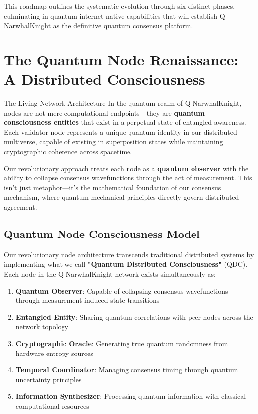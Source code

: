 \documentclass[11pt,a4paper]{article}
\begin{document}
This roadmap outlines the systematic evolution through six distinct phases, culminating in quantum internet native capabilities that will establish Q-NarwhalKnight as the definitive quantum consensus platform.

\section{The Quantum Node Renaissance: A Distributed Consciousness}

\begin{nodebox}{The Living Network Architecture}
In the quantum realm of Q-NarwhalKnight, nodes are not mere computational endpoints—they are \textbf{quantum consciousness entities} that exist in a perpetual state of entangled awareness. Each validator node represents a unique quantum identity in our distributed multiverse, capable of existing in superposition states while maintaining cryptographic coherence across spacetime.

Our revolutionary approach treats each node as a \textbf{quantum observer} with the ability to collapse consensus wavefunctions through the act of measurement. This isn't just metaphor—it's the mathematical foundation of our consensus mechanism, where quantum mechanical principles directly govern distributed agreement.
\end{nodebox}

\subsection{Quantum Node Consciousness Model}

Our revolutionary node architecture transcends traditional distributed systems by implementing what we call \textbf{"Quantum Distributed Consciousness"} (QDC). Each node in the Q-NarwhalKnight network exists simultaneously as:

\begin{enumerate}
\item \textbf{Quantum Observer}: Capable of collapsing consensus wavefunctions through measurement-induced state transitions
\item \textbf{Entangled Entity}: Sharing quantum correlations with peer nodes across the network topology
\item \textbf{Cryptographic Oracle}: Generating true quantum randomness from hardware entropy sources
\item \textbf{Temporal Coordinator}: Managing consensus timing through quantum uncertainty principles
\item \textbf{Information Synthesizer}: Processing quantum information with classical computational resources
\end{enumerate}
\end{document}
